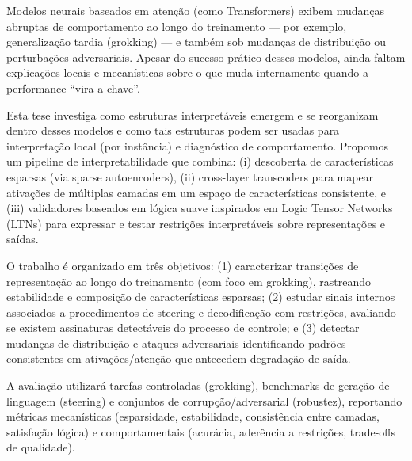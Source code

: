 \documentclass[../infufrgs/ppgc-tese.tex]{subfiles}
\begin{document}
\begin{translatedabstract}
Modelos neurais baseados em atenção (como Transformers) exibem mudanças abruptas de comportamento ao longo do treinamento — por exemplo, generalização tardia (grokking) — e também sob mudanças de distribuição ou perturbações adversariais. Apesar do sucesso prático desses modelos, ainda faltam explicações locais e mecanísticas sobre o que muda internamente quando a performance “vira a chave”.

Esta tese investiga como estruturas interpretáveis emergem e se reorganizam dentro desses modelos e como tais estruturas podem ser usadas para interpretação local (por instância) e diagnóstico de comportamento. Propomos um pipeline de interpretabilidade que combina: (i) descoberta de características esparsas (via sparse autoencoders), (ii) cross-layer transcoders para mapear ativações de múltiplas camadas em um espaço de características consistente, e (iii) validadores baseados em lógica suave inspirados em Logic Tensor Networks (LTNs) para expressar e testar restrições interpretáveis sobre representações e saídas.

O trabalho é organizado em três objetivos: (1) caracterizar transições de representação ao longo do treinamento (com foco em grokking), rastreando estabilidade e composição de características esparsas; (2) estudar sinais internos associados a procedimentos de steering e decodificação com restrições, avaliando se existem assinaturas detectáveis do processo de controle; e (3) detectar mudanças de distribuição e ataques adversariais identificando padrões consistentes em ativações/atenção que antecedem degradação de saída.

A avaliação utilizará tarefas controladas (grokking), benchmarks de geração de linguagem (steering) e conjuntos de corrupção/adversarial (robustez), reportando métricas mecanísticas (esparsidade, estabilidade, consistência entre camadas, satisfação lógica) e comportamentais (acurácia, aderência a restrições, trade-offs de qualidade).
\end{translatedabstract}
\end{document}

